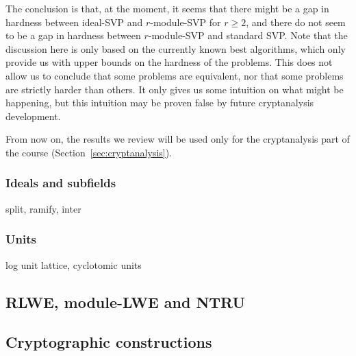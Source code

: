 The conclusion is that, at the moment, it seems that there might be a gap in hardness between ideal-SVP and $r$-module-SVP for $r \geq 2$, and there do not seem to be a gap in hardness between $r$-module-SVP and standard SVP. Note that the discussion here is only based on the currently known best algorithms, which only provide us with upper bounds on the hardness of the problems. This does not allow us to conclude that some problems are equivalent, nor that some problems are strictly harder than others. It only gives us some intuition on what might be happening, but this intuition may be proven false by future cryptanalysis development.




From now on, the results we review will be used only for the cryptanalysis part of the course (Section~\ref{sec:cryptanalysis}).

\subsubsection{Ideals and subfields}
split, ramify, inter

\subsubsection{Units}
log unit lattice, cyclotomic units



\subsection{RLWE, module-LWE and NTRU}
\label{sec:rlwe-mlwe-ntru}

\subsection{Cryptographic constructions}
\label{sec:constructions}

